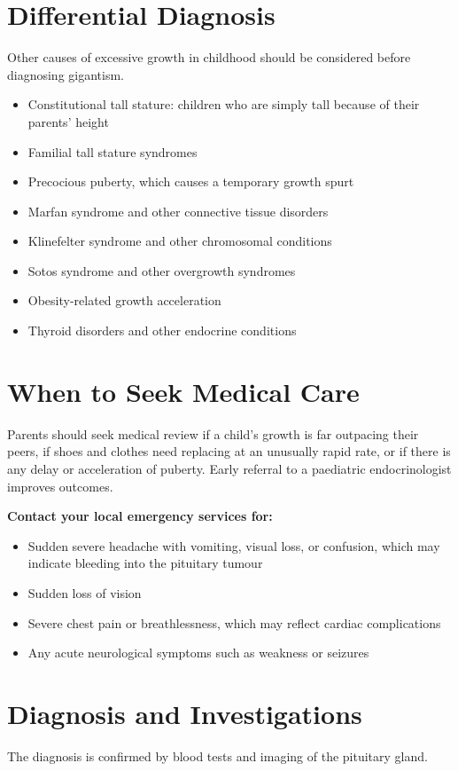 \section*{Differential Diagnosis}
Other causes of excessive growth in childhood should be considered before diagnosing gigantism.

\begin{itemize}
    \item Constitutional tall stature: children who are simply tall because of their parents' height
    \item Familial tall stature syndromes
    \item Precocious puberty, which causes a temporary growth spurt
    \item Marfan syndrome and other connective tissue disorders
    \item Klinefelter syndrome and other chromosomal conditions
    \item Sotos syndrome and other overgrowth syndromes
    \item Obesity-related growth acceleration
    \item Thyroid disorders and other endocrine conditions
\end{itemize}

\section*{When to Seek Medical Care}
Parents should seek medical review if a child's growth is far outpacing their peers, if shoes and clothes need replacing at an unusually rapid rate, or if there is any delay or acceleration of puberty. Early referral to a paediatric endocrinologist improves outcomes.

\textbf{Contact your local emergency services for:}
\begin{itemize}
    \item Sudden severe headache with vomiting, visual loss, or confusion, which may indicate bleeding into the pituitary tumour
    \item Sudden loss of vision
    \item Severe chest pain or breathlessness, which may reflect cardiac complications
    \item Any acute neurological symptoms such as weakness or seizures
\end{itemize}

\section*{Diagnosis and Investigations}
The diagnosis is confirmed by blood tests and imaging of the pituitary gland.

